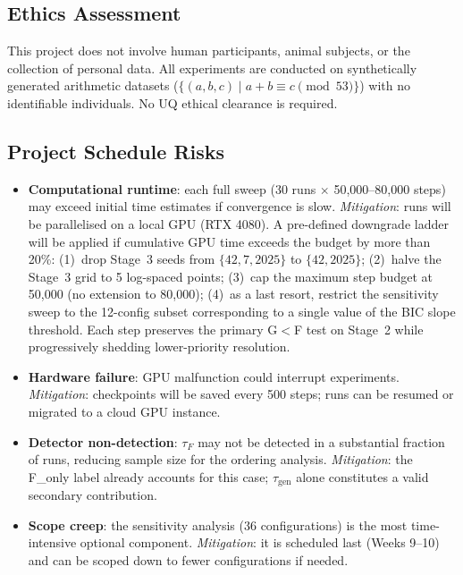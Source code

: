 \documentclass[12pt,openany,a4paper]{book}
\newcommand{\taug}{\tau_{\mathrm{gen}}}
\newcommand{\tauf}{\tau_{F}}
\begin{document}
\subsection{Ethics Assessment}

This project does not involve human participants, animal subjects, or the collection of personal data.
All experiments are conducted on synthetically generated arithmetic
datasets ($\{(a,b,c) \mid a+b \equiv c \pmod{53}\}$) with no
identifiable individuals.
No UQ ethical clearance is required.

\subsection{Project Schedule Risks}

\begin{itemize}
  \item \textbf{Computational runtime}: each full sweep (30 runs
    $\times$ 50{,}000--80{,}000 steps) may exceed initial time
    estimates if convergence is slow.
    \textit{Mitigation}: runs will be parallelised on a local GPU
    (RTX 4080).
    A pre-defined downgrade ladder will be applied if cumulative GPU
    time exceeds the budget by more than 20\%:
    (1)~drop Stage~3 seeds from $\{42, 7, 2025\}$ to $\{42, 2025\}$;
    (2)~halve the Stage~3 grid to 5 log-spaced points;
    (3)~cap the maximum step budget at 50{,}000 (no extension to
    80{,}000); (4)~as a last resort, restrict the sensitivity sweep
    to the 12-config subset corresponding to a single value of the
    BIC slope threshold.
    Each step preserves the primary G$<$F test on Stage~2 while
    progressively shedding lower-priority resolution.
  \item \textbf{Hardware failure}: GPU malfunction could interrupt
    experiments.
    \textit{Mitigation}: checkpoints will be saved every 500 steps; runs
    can be resumed or migrated to a cloud GPU instance.
  \item \textbf{Detector non-detection}: $\tauf$ may not be detected
    in a substantial fraction of runs, reducing sample size for the
    ordering analysis.
    \textit{Mitigation}: the F\_only label already accounts for this
    case; $\taug$ alone constitutes a valid secondary contribution.
  \item \textbf{Scope creep}: the sensitivity analysis (36 configurations)
    is the most time-intensive optional component.
    \textit{Mitigation}: it is scheduled last (Weeks 9--10) and can
    be scoped down to fewer configurations if needed.
\end{itemize}
\end{document}
